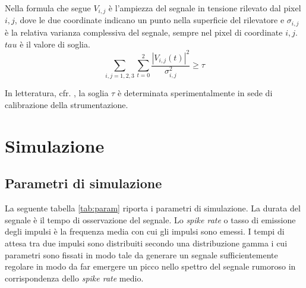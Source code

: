 Nella formula che segue $V_{i,j}$ è l'ampiezza del segnale in tensione rilevato dal pixel $i,j$, dove le due coordinate indicano un punto nella superficie del rilevatore e $\sigma_{i,j}$ è la relativa varianza complessiva del segnale, sempre nel pixel di coordinate $i,j$. $tau$ è il valore di soglia.
\begin{equation}
 \sum_{i,j=1,2,3} \sum_{t=0}^{2} \frac{|V_{i,j}(t)|^{2}}{\sigma_{i,j}^{2}} \geq \tau
\end{equation}

In letteratura, cfr. \cite{Lambacher2011}, la soglia $\tau$ è determinata sperimentalmente in sede di calibrazione della strumentazione.





\chapter{Simulazione}



\section{Parametri di simulazione}
\label{sec:examples}

La seguente tabella \ref{tab:param} riporta i parametri di simulazione.
La durata del segnale è il tempo di osservazione del segnale. Lo {\it spike rate} o tasso di emissione degli impulsi è la frequenza media con cui gli impulsi sono emessi. I tempi di attesa tra due impulsi sono distribuiti secondo una distribuzione gamma i cui parametri sono fissati in modo tale da generare un segnale sufficientemente regolare in modo da far emergere un picco nello spettro del segnale rumoroso in corrispondenza dello {\it spike rate} medio.

